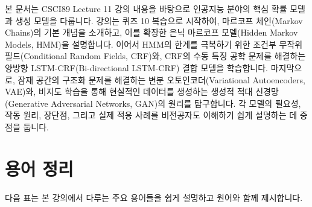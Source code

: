 \documentclass[11pt,a4paper]{article}
\begin{document}
\begin{tcolorbox}[summarybox, title=개요]
본 문서는 CSCI89 Lecture 11 강의 내용을 바탕으로 인공지능 분야의 핵심 확률 모델과 생성 모델을 다룹니다.
강의는 퀴즈 10 복습으로 시작하여, 마르코프 체인(Markov Chains)의 기본 개념을 소개하고, 이를 확장한 은닉 마르코프 모델(Hidden Markov Models, HMM)을 설명합니다.
이어서 HMM의 한계를 극복하기 위한 조건부 무작위 필드(Conditional Random Fields, CRF)와, CRF의 수동 특징 공학 문제를 해결하는 양방향 LSTM-CRF(Bi-directional LSTM-CRF) 결합 모델을 학습합니다.
마지막으로, 잠재 공간의 구조화 문제를 해결하는 변분 오토인코더(Variational Autoencoders, VAE)와, 비지도 학습을 통해 현실적인 데이터를 생성하는 생성적 적대 신경망(Generative Adversarial Networks, GAN)의 원리를 탐구합니다.
각 모델의 필요성, 작동 원리, 장단점, 그리고 실제 적용 사례를 비전공자도 이해하기 쉽게 설명하는 데 중점을 둡니다.
\end{tcolorbox}

\newpage
\section*{용어 정리}

다음 표는 본 강의에서 다루는 주요 용어들을 쉽게 설명하고 원어와 함께 제시합니다.
\end{document}
